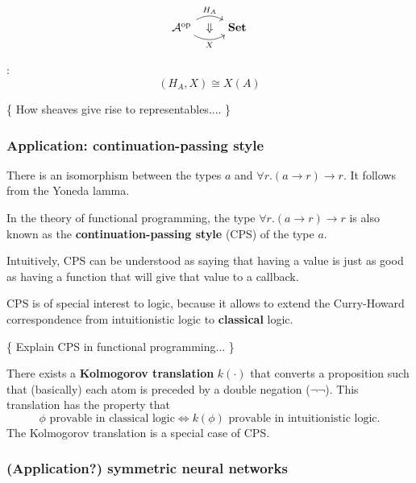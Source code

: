 \begin{equation}
\begin{tikzcd}
\mathcal{A}^{\mathrm{op}} 
\arrow[r, bend left=30, "H_A"]
\arrow[r, bend right=30, swap, "X"]
\arrow[r, phantom, "\Downarrow"]
& \mathbf{Set}
\end{tikzcd}
\end{equation}

:
\begin{equation}
[\mathcal{A}^{\mathrm{op}} , \mathbf{Set}] (H_A, X) \cong X(A)
\end{equation}

\{ How sheaves give rise to representables.... \}

\subsubsection{Application: continuation-passing style}

There is an isomorphism between the types $a$ and $\forall r. (a \rightarrow r) \rightarrow r$.  It follows from the Yoneda lamma.

In the theory of functional programming, the type $\forall r. (a \rightarrow r) \rightarrow r$ is also known as the \textbf{continuation-passing style} (CPS) of the type $a$.

Intuitively, CPS can be understood as saying that having a value is just as good as having a function that will give that value to a callback.

CPS is of special interest to logic, because it allows to extend the Curry-Howard correspondence from intuitionistic logic to \textbf{classical} logic.

\{ Explain CPS in functional programming... \}

There exists a \textbf{Kolmogorov translation} $k(\cdot)$ that converts a proposition such that (basically) each atom is preceded by a double negation ($\neg \neg$).  This translation has the property that
\begin{equation}
\phi \mbox{ provable in classical logic} \Leftrightarrow k(\phi) \mbox{ provable in intuitionistic logic.}
\end{equation}
The Kolmogorov translation is a special case of CPS.

\subsubsection{(Application?) symmetric neural networks}

